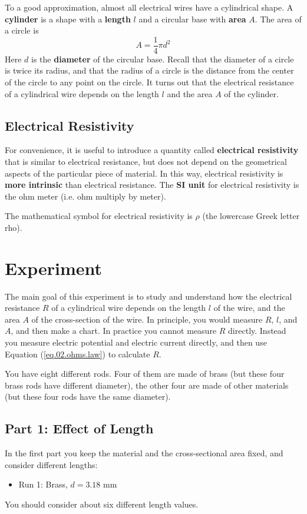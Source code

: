 To a good approximation, almost all electrical wires have a cylindrical shape. A \textbf{cylinder} is a shape with a \textbf{length} $l$ and a circular base with \textbf{area} $A$. The area of a circle is
\begin{equation}
	A = \frac{1}{4} \pi d^{2}
	\label{eq.02.area}
\end{equation}
Here $d$ is the \textbf{diameter} of the circular base. Recall that the diameter of a circle is twice its radius, and that the radius of a circle is the distance from the center of the circle to any point on the circle. It turns out that the electrical resistance of a cylindrical wire depends on the length $l$ and the area $A$ of the cylinder.
%
\subsection{Electrical Resistivity}
%
For convenience, it is useful to introduce a quantity called \textbf{electrical resistivity} that is similar to electrical resistance, but does not depend on the geometrical aspects of the particular piece of material. In this way, electrical resistivity is \textbf{more intrinsic} than electrical resistance. The \textbf{SI unit} for electrical resistivity is the ohm{ }\textperiodcentered{ }meter (i.e. ohm multiply by meter).

The mathematical symbol for electrical resistivity is $\rho$ (the lowercase Greek letter rho).
%
\section{Experiment}
%
The main goal of this experiment is to study and understand how the electrical resistance $R$ of a cylindrical wire depends on the length $l$ of the wire, and the area $A$ of the cross-section of the wire. In principle, you would measure $R$, $l$, and $A$, and then make a chart. In practice you cannot measure $R$ directly. Instead you measure electric potential and electric current directly, and then use Equation (\ref{eq.02.ohms.law}) to calculate $R$.

You have eight different rods. Four of them are made of brass (but these four brass rods have different diameter), the other four are made of other materials (but these four rods have the same diameter).
%
\subsection{Part 1: Effect of Length}
%
In the first part you keep the material and the cross-sectional area fixed, and consider different lengths:
\begin{itemize}
	\item Run 1: Brass, $d = 3.18$ mm
\end{itemize}
You should consider about six different length values.
%
